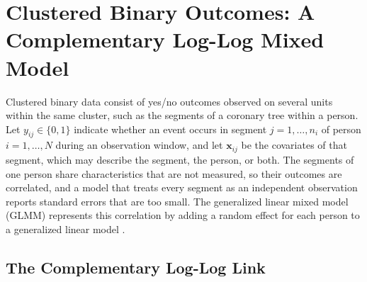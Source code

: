 
\section{Clustered Binary Outcomes: A Complementary Log-Log Mixed Model}
\label{sec:tech-segment-glmm}

Clustered binary data consist of yes/no outcomes observed on several units within the same cluster, such as the segments of a coronary tree within a person.
Let $y_{ij} \in \{0, 1\}$ indicate whether an event occurs in segment $j = 1, \dots, n_i$ of person $i = 1, \dots, N$ during an observation window, and let $\mathbf{x}_{ij}$ be the covariates of that segment, which may describe the segment, the person, or both.
The segments of one person share characteristics that are not measured, so their outcomes are correlated, and a model that treats every segment as an independent observation reports standard errors that are too small.
The generalized linear mixed model (GLMM) represents this correlation by adding a random effect for each person to a generalized linear model \cite{statacorp2025mecloglog}.

\subsection{The Complementary Log-Log Link}
\label{sec:tech-cloglog}


